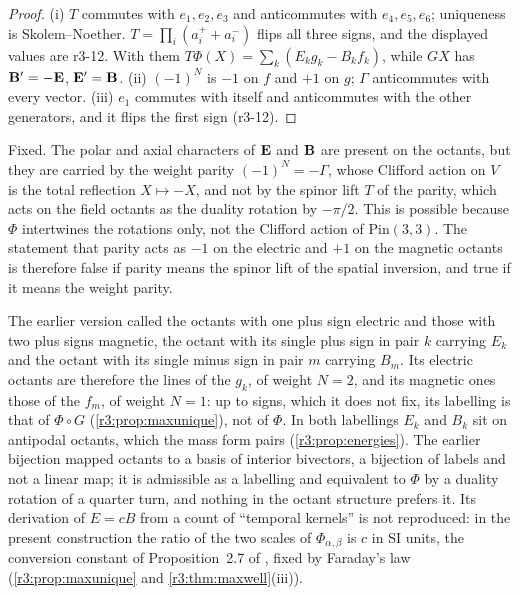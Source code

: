 \begin{proof}
(i) $T$ commutes with $e_1,e_2,e_3$ and anticommutes with $e_4,e_5,e_6$; uniqueness is Skolem--Noether. $T=\prod_i(a^+_i+a^-_i)$ flips all three
signs, and the displayed values are r3-12. With them $T\Phi(X)=\sum_k(E_kg_k-B_kf_k)$, while $GX$ has $\mathbf B'=-\mathbf E$, $\mathbf E'=\mathbf B$. (ii) $(-1)^N$ is $-1$ on
$f$ and $+1$ on $g$; $\Gamma$ anticommutes with every vector. (iii) $e_1$ commutes with itself and anticommutes with the other generators,
and it flips the first sign (r3-12).
\end{proof}

Fixed. The polar and axial characters of $\mathbf E$ and $\mathbf B$ are present on the octants, but they are carried by the weight parity
$(-1)^N=-\Gamma$, whose Clifford action on $V$ is the total reflection $X\mapsto-X$, and not by the spinor lift $T$ of the parity, which acts on
the field octants as the duality rotation by $-\pi/2$. This is possible because $\Phi$ intertwines the rotations only, not the Clifford
action of $\mathrm{Pin}(3,3)$. The statement that parity acts as $-1$ on the electric and $+1$ on the magnetic octants is therefore false if
parity means the spinor lift of the spatial inversion, and true if it means the weight parity.

\begin{remark}
\label{r3:rem:bijection}
The earlier version called the octants with one plus sign electric and those with two plus signs magnetic, the octant with its single
plus sign in pair $k$ carrying $E_k$ and the octant with its single minus sign in pair $m$ carrying $B_m$. Its electric octants are therefore
the lines of the $g_k$, of weight $N=2$, and its magnetic ones those of the $f_m$, of weight $N=1$: up to signs, which it does not fix, its
labelling is that of $\Phi\circ G$ (\cref{r3:prop:maxunique}), not of $\Phi$. In both labellings $E_k$ and $B_k$ sit on antipodal octants,
which the mass form pairs (\cref{r3:prop:energies}). The earlier bijection mapped octants to a basis of interior bivectors, a bijection of labels
and not a linear map; it is admissible as a labelling and equivalent to $\Phi$ by a duality rotation of a quarter turn, and nothing in the
octant structure prefers it. Its derivation of $E=cB$ from a count of ``temporal kernels'' is not reproduced: in the present construction the
ratio of the two scales of $\Phi_{\alpha,\beta}$ is $c$ in SI units, the conversion constant of Proposition~2.7 of \cite{RE}, fixed by Faraday's
law (\cref{r3:prop:maxunique} and \cref{r3:thm:maxwell}(iii)).
\end{remark}

